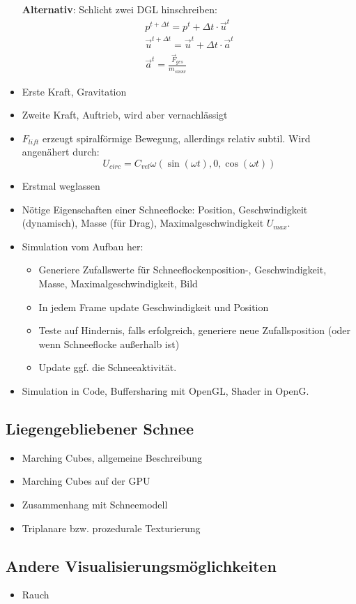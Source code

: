 \begin{itemize}
\textbf{Alternativ}: Schlicht zwei DGL hinschreiben:
\begin{gather}
p^{t + \Delta t} = p^{t} + \Delta t \cdot \vec{u}^{t} \\
\vec{u}^{t+ \Delta t} = \vec{u}^{t} + \Delta t \cdot \vec{a}^{t} \\
\vec{a}^t = \frac{\vec{F}_{ges}}{m_{snow}}
\end{gather}
\item Erste Kraft, Gravitation
\item Zweite Kraft, Auftrieb, wird aber vernachlässigt
\item $F_{lift}$ erzeugt spiralförmige Bewegung, allerdings relativ subtil. Wird angenähert durch:
\[
U_{circ} = C_{vel} \omega (\sin(\omega t),0,\cos(\omega t))
\]
\item Erstmal weglassen
\item Nötige Eigenschaften einer Schneeflocke: Position, Geschwindigkeit (dynamisch), Masse (für Drag), Maximalgeschwindigkeit $U_{max}$.
\item Simulation vom Aufbau her:
    \begin{itemize}
            \item Generiere Zufallswerte für Schneeflockenposition-,
            Geschwindigkeit, Masse, Maximalgeschwindigkeit, Bild
            \item In jedem Frame update Geschwindigkeit und Position
            \item Teste auf Hindernis, falls erfolgreich, generiere neue
            Zufallsposition (oder wenn Schneeflocke außerhalb ist)
            \item Update ggf. die Schneeaktivität.
    \end{itemize}
\item Simulation in Code, Buffersharing mit OpenGL, Shader in OpenG.
\end{itemize}

\subsection{Liegengebliebener Schnee}

\begin{itemize}
\item Marching Cubes, allgemeine Beschreibung
\item Marching Cubes auf der GPU
\item Zusammenhang mit Schneemodell
\item Triplanare bzw. prozedurale Texturierung
\end{itemize}

\subsection{Andere Visualisierungsmöglichkeiten}

\begin{itemize}
\item Rauch
\end{itemize}
